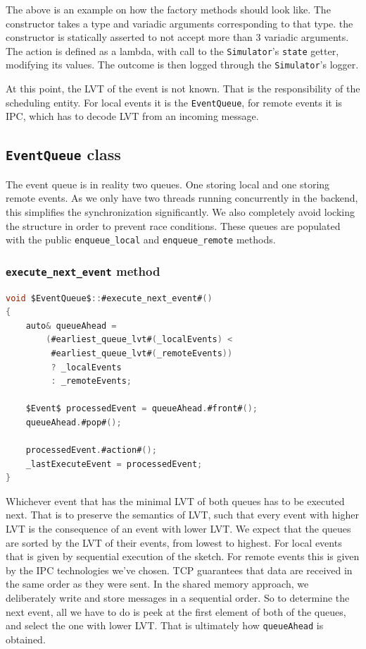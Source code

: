 The above is an example on how the factory methods should look like. The constructor takes a type and variadic arguments corresponding to that type. the constructor is statically asserted to not accept more than 3 variadic arguments. The action is defined as a lambda, with call to the \texttt{Simulator}'s \texttt{state} getter, modifying its values. The outcome is then logged through the \texttt{Simulator}'s logger. 

At this point, the LVT of the event is not known. That is the responsibility of the scheduling entity. For local events it is the \texttt{EventQueue}, for remote events it is IPC, which has to decode LVT from an incoming message.

\subsection{\texttt{EventQueue} class}

The event queue is in reality two queues. One storing local and one storing remote events. As we only have two threads running concurrently in the backend, this simplifies the synchronization significantly. We also completely avoid locking the structure in order to prevent race conditions. These queues are populated with the public \texttt{enqueue\_local} and \texttt{enqueue\_remote} methods.

\subsubsection{\texttt{execute\_next\_event} method}

\begin{lstlisting}[language=csharp, caption={\texttt{EventQueue::execute\_next\_event} method}]
void $EventQueue$::#execute_next_event#()
{
    auto& queueAhead = 
        (#earliest_queue_lvt#(_localEvents) < 
         #earliest_queue_lvt#(_remoteEvents))
         ? _localEvents
         : _remoteEvents;

    $Event$ processedEvent = queueAhead.#front#();
    queueAhead.#pop#();

    processedEvent.#action#();
    _lastExecuteEvent = processedEvent;
}
\end{lstlisting}

Whichever event that has the minimal LVT of both queues has to be executed next. That is to preserve the semantics of LVT, such that every event with higher LVT is the consequence of an event with lower LVT. We expect that the queues are sorted by the LVT of their events, from lowest to highest. For local events that is given by sequential execution of the sketch. For remote events this is given by the IPC technologies we've chosen. TCP guarantees that data are received in the same order as they were sent. In the shared memory approach, we deliberately write and store messages in a sequential order. So to determine the next event, all we have to do is peek at the first element of both of the queues, and select the one with lower LVT. That is ultimately how \texttt{queueAhead} is obtained.

